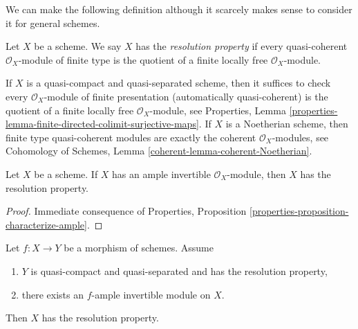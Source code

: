 \medskip\noindent
We can make the following definition although it scarcely makes
sense to consider it for general schemes.

\begin{definition}
\label{definition-resolution-property}
Let $X$ be a scheme. We say $X$ has the {\it resolution property}
if every quasi-coherent $\mathcal{O}_X$-module of finite type
is the quotient of a finite locally free $\mathcal{O}_X$-module.
\end{definition}

\noindent
If $X$ is a quasi-compact and quasi-separated scheme, then it suffices to check
every $\mathcal{O}_X$-module of finite presentation (automatically
quasi-coherent) is the quotient of a finite locally free
$\mathcal{O}_X$-module, see Properties, Lemma
\ref{properties-lemma-finite-directed-colimit-surjective-maps}.
If $X$ is a Noetherian scheme, then finite type quasi-coherent modules
are exactly the coherent $\mathcal{O}_X$-modules, see
Cohomology of Schemes, Lemma \ref{coherent-lemma-coherent-Noetherian}.

\begin{lemma}
\label{lemma-resolution-property-ample}
Let $X$ be a scheme. If $X$ has an ample invertible $\mathcal{O}_X$-module,
then $X$ has the resolution property.
\end{lemma}

\begin{proof}
Immediate consequence of Properties, Proposition
\ref{properties-proposition-characterize-ample}.
\end{proof}

\begin{lemma}
\label{lemma-resolution-property-ample-relative}
Let $f : X \to Y$ be a morphism of schemes. Assume
\begin{enumerate}
\item $Y$ is quasi-compact and quasi-separated and has the resolution property,
\item there exists an $f$-ample invertible module on $X$.
\end{enumerate}
Then $X$ has the resolution property.
\end{lemma}

